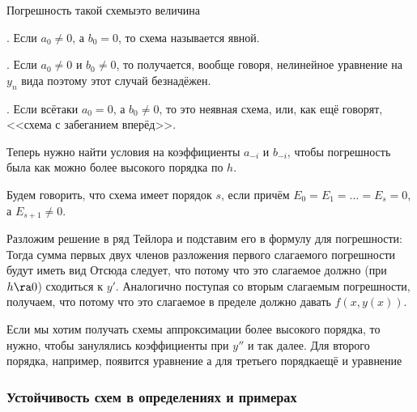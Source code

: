 \documentclass[a4paper]{article}
\begin{document}
Погрешность такой схемы\т это величина

\begin{df}

. Если $a_0 \ne 0$, а $b_0 = 0$, то схема называется явной.

. Если $a_0 \ne 0$ и $b_0 \ne 0$, то получается, вообще говоря, нелинейное уравнение на $y_n$
вида
поэтому этот случай безнадёжен.

. Если всё\д таки $a_0 = 0$, а $b_0 \ne 0$, то это неявная схема, или, как ещё говорят,
<<схема с забеганием вперёд>>.
\end{df}

Теперь нужно найти условия на коэффициенты $a_{-i}$ и $b_{-i}$, чтобы погрешность была как можно более
высокого порядка по $h$.

\begin{df}
Будем говорить, что схема имеет порядок $s$, если
причём $E_0 = E_1 = \dots = E_s = 0$, а $E_{s+1} \ne 0$.
\end{df}

Разложим решение в ряд Тейлора и подставим его в формулу для погрешности:
Тогда сумма первых двух членов разложения первого слагаемого погрешности будут иметь вид
Отсюда следует, что
потому что это слагаемое должно (при $h \ra 0$) сходиться к $y'$.
Аналогично поступая со вторым слагаемым погрешности, получаем, что
потому что это слагаемое в пределе должно давать $f(x,y(x))$.

Если мы хотим получать схемы аппроксимации более высокого порядка,
то нужно, чтобы занулялись коэффициенты при $y''$ и так далее.
Для второго порядка, например, появится уравнение
а для третьего порядка\т ещё и уравнение

\subsubsection{Устойчивость схем в определениях и примерах}
\end{document}
